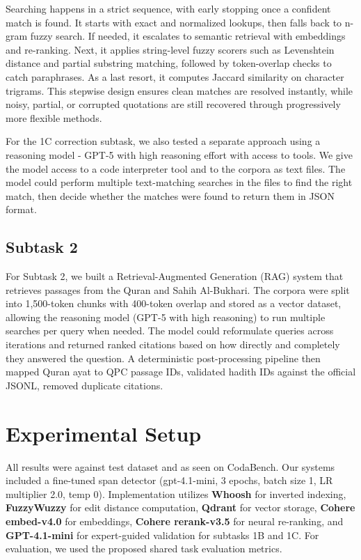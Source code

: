 \documentclass[11pt]{article}
\begin{document}
Searching happens in a strict sequence, with early stopping once a confident match is found. It starts with exact and normalized lookups, then falls back to n-gram fuzzy search. If needed, it escalates to semantic retrieval with embeddings and re-ranking. Next, it applies string-level fuzzy scorers such as Levenshtein distance and partial substring matching, followed by token-overlap checks to catch paraphrases. As a last resort, it computes Jaccard similarity on character trigrams. This stepwise design ensures clean matches are resolved instantly, while noisy, partial, or corrupted quotations are still recovered through progressively more flexible methods.

For the 1C correction subtask, we also tested a separate approach using a reasoning model - GPT-5 with high reasoning effort with access to tools. We give the model access to a code interpreter tool and to the corpora as text files. The model could perform multiple text-matching searches in the files to find the right match, then decide whether the matches were found  to return them in JSON format.

\subsection{Subtask 2 }
For Subtask 2, we built a Retrieval-Augmented Generation (RAG) system that retrieves passages from the Quran and Sahih Al-Bukhari. The corpora were split into 1,500-token chunks with 400-token overlap and stored as a vector dataset, allowing the reasoning model (GPT-5 with high reasoning) to run multiple searches per query when needed. The model could reformulate queries across iterations and returned ranked citations based on how directly and completely they answered the question. A deterministic post-processing pipeline then mapped Quran ayat to QPC \citet{malhas2020ayatec} passage IDs, validated hadith IDs against the official JSONL, removed duplicate citations.

\section{Experimental Setup}
    All results were against test dataset and as seen on CodaBench. Our systems included a fine-tuned span detector (gpt-4.1-mini, 3 epochs, batch size 1, LR multiplier 2.0, temp 0). Implementation utilizes \textbf{Whoosh} for inverted indexing, \textbf{FuzzyWuzzy} for edit distance computation, \textbf{Qdrant} for vector storage, \textbf{Cohere embed-v4.0} for embeddings, \textbf{Cohere rerank-v3.5} for neural re-ranking, and \textbf{GPT-4.1-mini } for expert-guided validation for subtasks 1B and 1C.
    For evaluation, we used the proposed shared task evaluation metrics.
\end{document}
